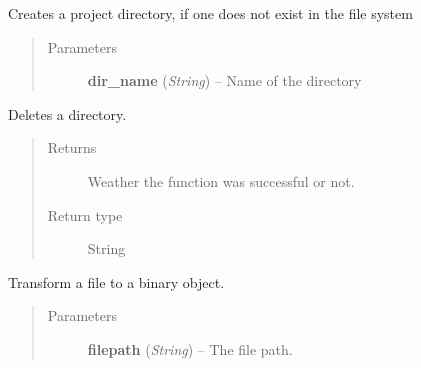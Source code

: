 \documentclass[letterpaper,10pt,english]{sphinxmanual}
\begin{document}

\begin{fulllineitems}
\label{filesystem:filesystem.create_project_directory}
Creates a project directory, if one does not exist in the file system
\begin{quote}\begin{description}
\item[{Parameters}] \leavevmode
\textbf{dir\_name} (\emph{String}) -- Name of the directory

\end{description}\end{quote}

\end{fulllineitems}


\begin{fulllineitems}
\label{filesystem:filesystem.delete_directory}
Deletes a directory.
\begin{quote}\begin{description}
\item[{Returns}] \leavevmode
Weather the function was successful or not.

\item[{Return type}] \leavevmode
String

\end{description}\end{quote}

\end{fulllineitems}


\begin{fulllineitems}
\label{filesystem:filesystem.file_to_base64}
Transform a file to a binary object.
\begin{quote}\begin{description}
\item[{Parameters}] \leavevmode
\textbf{filepath} (\emph{String}) -- The file path.

\end{description}\end{quote}

\end{fulllineitems}
\end{document}
